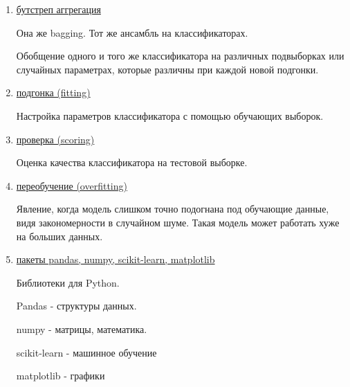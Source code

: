 \documentclass{proc}
\begin{document}
\begin{enumerate}
\item \underline{бутстреп аггрегация}

Она же bagging. Тот же ансамбль на классификаторах.

Обобщение одного и того же классификатора на различных подвыборках или случайных параметрах, которые различны при каждой новой подгонки.

\item \underline{подгонка (fitting)}

Настройка параметров классификатора с помощью обучающих выборок.

\item \underline{проверка (scoring)}

Оценка качества классификатора на тестовой выборке.

\item \underline{переобучение (overfitting)}

Явление, когда модель слишком точно подогнана под обучающие данные, видя закономерности в случайном шуме. Такая модель может работать хуже на больших данных.

\item \underline{пакеты pandas, numpy, scikit-learn, matplotlib}

Библиотеки для Python.

Pandas - структуры данных.

numpy - матрицы, математика.

scikit-learn - машинное обучение

matplotlib - графики
\end{enumerate}
\end{document}

